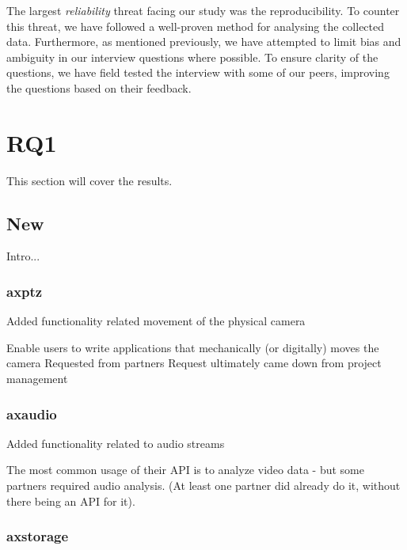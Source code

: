 \documentclass[conference]{IEEEtran}
\begin{document}
The largest \textit{reliability} threat facing our study was the reproducibility. To counter this threat, we have followed a well-proven method for analysing the collected data. Furthermore, as mentioned previously, we have attempted to limit bias and ambiguity in our interview questions where possible. To ensure clarity of the questions, we have field tested the interview with some of our peers, improving the questions based on their feedback.


 \newpage
\section{RQ1} \label{results}
This section will cover the results.


\subsection{New}
Intro...

\subsubsection{axptz}

Added functionality related movement of the physical camera



Enable users to write applications that mechanically (or digitally) moves the camera
Requested from partners
Request ultimately came down from project management









\subsubsection{axaudio}

Added functionality related to audio streams



The most common usage of their API is to analyze video data - but some partners required audio analysis. (At least one partner did already do it, without there being an API for it).







\subsubsection{axstorage}
\end{document}
